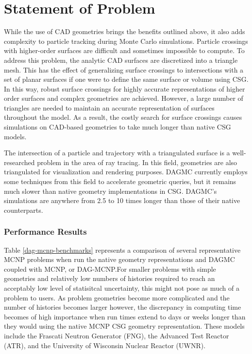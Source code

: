 \section{Statement of Problem}

While the use of CAD geometries brings the benefits outlined above, it also adds
complexity to particle tracking during Monte Carlo simulations. Particle
crossings with higher-order surfaces are difficult and sometimes impossible to
compute. To address this problem, the analytic CAD surfaces are
discretized into a triangle mesh. This has the effect of generalizing surface crossings to
intersections with a set of planar surfaces if one were to define the same
surface or volume using CSG. In this way, robust surface crossings for highly
accurate representations of higher order surfaces and complex geometries are
achieved. However, a large number of triangles are needed to maintain an
accurate representation of surfaces throughout the model. As a result, the
costly search for surface crossings causes simulations on CAD-based geometries
to take much longer than native CSG models.

The intersection of a particle and trajectory with a triangulated surface is a
well-researched problem in the area of ray tracing. In this field, geometries
are also triangulated for visualization and rendering purposes. DAGMC currently
employs some techniques from this field to accelerate geometric queries, but it
remains much slower than native geometry implementations in CSG. DAGMC's
simulations are anywhere from 2.5 to 10 times longer than those of their native
counterparts.

\subsubsection{Performance Results}%

Table \ref{dag-mcnp-benchmarks} represents a comparison of several
representative MCNP problems when run the native geometry representations and
DAGMC coupled with MCNP, or DAG-MCNP.For smaller problems with simple geometries
and relatively low numbers of histories required to reach an acceptably low
level of statisitcal uncertainty, this might not pose as much of a problem to
users. As problem geometries become more complicated and the number of histories
becomes larger however, the discrepancy in computing time becomes of high
importance when run times extend to days or weeks longer than they would using
the native MCNP CSG geometry representation. These models include the Frascati
Neutron Generator (FNG), the Advanced Test Reactor (ATR), and the University of
Wisconsin Nuclear Reactor (UWNR).

